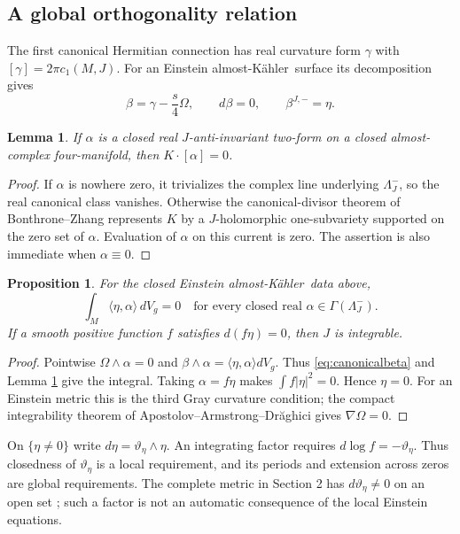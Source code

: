 \documentclass[11pt,a4paper]{article}
\newtheorem{proposition}[theorem]{Proposition}
\newtheorem{lemma}[theorem]{Lemma}
\theoremstyle{definition}
\theoremstyle{remark}
\newcommand{\dd}{\,dV_g}
\newcommand{\AK}{almost-K\"ahler}
\begin{document}
\subsection{A global orthogonality relation}
The first canonical Hermitian connection has real curvature form $\gamma$ with $[\gamma]=2\pi c_1(M,J)$. For an Einstein \AK\ surface its decomposition gives
\begin{equation}\label{eq:canonicalbeta}
 \beta=\gamma-\frac s4\Omega,\qquad d\beta=0,\qquad \beta^{J,-}=\eta.
\end{equation}
\begin{lemma}\label{lem:canonicalpair}
If $\alpha$ is a closed real $J$-anti-invariant two-form on a closed almost-complex four-manifold, then $K\cdot[\alpha]=0$.
\end{lemma}
\begin{proof}
If $\alpha$ is nowhere zero, it trivializes the complex line underlying $\Lambda_J^-$, so the real canonical class vanishes. Otherwise the canonical-divisor theorem of Bonthrone--Zhang \cite{BZ} represents $K$ by a $J$-holomorphic one-subvariety supported on the zero set of $\alpha$. Evaluation of $\alpha$ on this current is zero. The assertion is also immediate when $\alpha\equiv0$.
\end{proof}
\begin{proposition}\label{prop:orthogonality}
For the closed Einstein \AK\ data above,
\[
 \int_M\langle\eta,\alpha\rangle\dd=0
 \quad\text{for every closed real }\alpha\in\Gamma(\Lambda_J^-).
\]
If a smooth positive function $f$ satisfies $d(f\eta)=0$, then $J$ is integrable.
\end{proposition}
\begin{proof}
Pointwise $\Omega\wedge\alpha=0$ and $\beta\wedge\alpha=\langle\eta,\alpha\rangle dV_g$. Thus \eqref{eq:canonicalbeta} and Lemma \ref{lem:canonicalpair} give the integral. Taking $\alpha=f\eta$ makes $\int f|\eta|^2=0$. Hence $\eta=0$. For an Einstein metric this is the third Gray curvature condition; the compact integrability theorem of Apostolov--Armstrong--Dr\u aghici \cite{AAD} gives $\nabla\Omega=0$.
\end{proof}
On $\{\eta\ne0\}$ write $d\eta=\vartheta_\eta\wedge\eta$. An integrating factor requires $d\log f=-\vartheta_\eta$. Thus closedness of $\vartheta_\eta$ is a local requirement, and its periods and extension across zeros are global requirements. The complete metric in Section 2 has $d\vartheta_\eta\ne0$ on an open set \cite{OrthogonalitySource}; such a factor is not an automatic consequence of the local Einstein equations.
\end{document}
